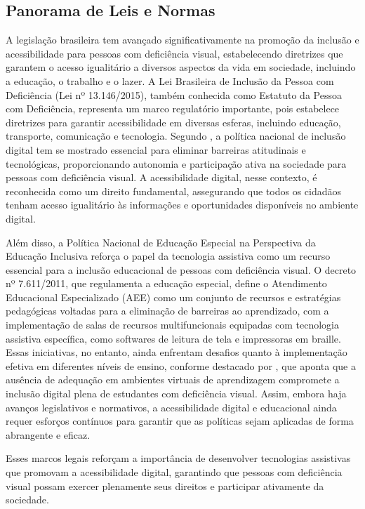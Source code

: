 \subsection{Panorama de Leis e Normas}

A legislação brasileira tem avançado significativamente na promoção da inclusão e acessibilidade para pessoas com deficiência visual, estabelecendo diretrizes que garantem o acesso igualitário a diversos aspectos da vida em sociedade, incluindo a educação, o trabalho e o lazer. A Lei Brasileira de Inclusão da Pessoa com Deficiência (Lei nº 13.146/2015), também conhecida como Estatuto da Pessoa com Deficiência, representa um marco regulatório importante, pois estabelece diretrizes para garantir acessibilidade em diversas esferas, incluindo educação, transporte, comunicação e tecnologia. Segundo , a política nacional de inclusão digital tem se mostrado essencial para eliminar barreiras atitudinais e tecnológicas, proporcionando autonomia e participação ativa na sociedade para pessoas com deficiência visual. A acessibilidade digital, nesse contexto, é reconhecida como um direito fundamental, assegurando que todos os cidadãos tenham acesso igualitário às informações e oportunidades disponíveis no ambiente digital.

Além disso, a Política Nacional de Educação Especial na Perspectiva da Educação Inclusiva \cite{Brasil2008} reforça o papel da tecnologia assistiva como um recurso essencial para a inclusão educacional de pessoas com deficiência visual. O decreto nº 7.611/2011, que regulamenta a educação especial, define o Atendimento Educacional Especializado (AEE) como um conjunto de recursos e estratégias pedagógicas voltadas para a eliminação de barreiras ao aprendizado, com a implementação de salas de recursos multifuncionais equipadas com tecnologia assistiva específica, como softwares de leitura de tela e impressoras em braille. Essas iniciativas, no entanto, ainda enfrentam desafios quanto à implementação efetiva em diferentes níveis de ensino, conforme destacado por , que aponta que a ausência de adequação em ambientes virtuais de aprendizagem compromete a inclusão digital plena de estudantes com deficiência visual. Assim, embora haja avanços legislativos e normativos, a acessibilidade digital e educacional ainda requer esforços contínuos para garantir que as políticas sejam aplicadas de forma abrangente e eficaz.

Esses marcos legais reforçam a importância de desenvolver tecnologias assistivas que promovam a acessibilidade digital, garantindo que pessoas com deficiência visual possam exercer plenamente seus direitos e participar ativamente da sociedade.

